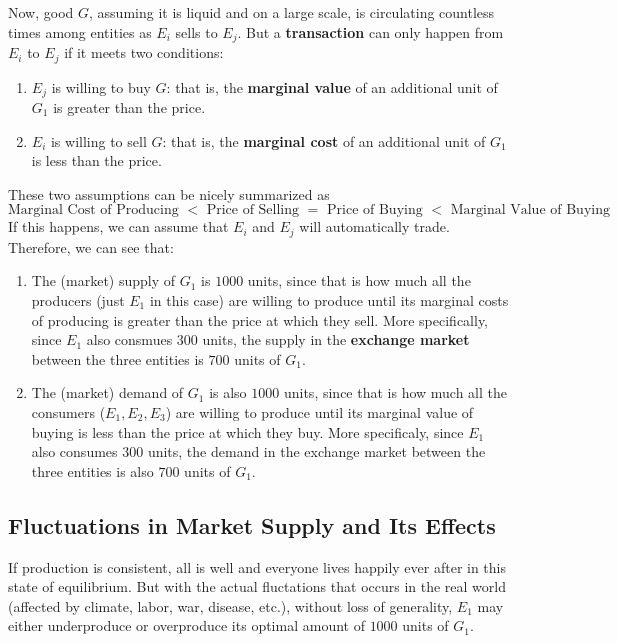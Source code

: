 \documentclass{article}
\begin{document}
    Now, good $G$, assuming it is liquid and on a large scale, is circulating countless times among entities as $E_i$ sells to $E_j$. But a \textbf{transaction} can only happen from $E_i$ to $E_j$ if it meets two conditions:
    \begin{enumerate}
      \item $E_j$ is willing to buy $G$: that is, the \textbf{marginal value} of an additional unit of $G_1$ is greater than the price.
      \item $E_i$ is willing to sell $G$: that is, the \textbf{marginal cost} of an additional unit of $G_1$ is less than the price.
    \end{enumerate}
    These two assumptions can be nicely summarized as
    \begin{equation}
      \text{Marginal Cost of Producing } < \text{ Price of Selling } = \text{ Price of Buying } < \text{ Marginal Value of Buying}
    \end{equation}
    If this happens, we can assume that $E_i$ and $E_j$ will automatically trade. Therefore, we can see that:
    \begin{enumerate}
      \item The (market) supply of $G_1$ is $1000$ units, since that is how much all the producers (just $E_1$ in this case) are willing to produce until its marginal costs of producing is greater than the price at which they sell. More specifically, since $E_1$ also consmues $300$ units, the supply in the \textbf{exchange market} between the three entities is $700$ units of $G_1$.
      \item The (market) demand of $G_1$ is also $1000$ units, since that is how much all the consumers ($E_1, E_2, E_3$) are willing to produce until its marginal value of buying is less than the price at which they buy. More specificaly, since $E_1$ also consumes $300$ units, the demand in the exchange market between the three entities is also $700$ units of $G_1$.
    \end{enumerate}

  \subsection{Fluctuations in Market Supply and Its Effects}

    If production is consistent, all is well and everyone lives happily ever after in this state of equilibrium. But with the actual fluctations that occurs in the real world (affected by climate, labor, war, disease, etc.), without loss of generality, $E_1$ may either underproduce or overproduce its optimal amount of $1000$ units of $G_1$.
\end{document}
